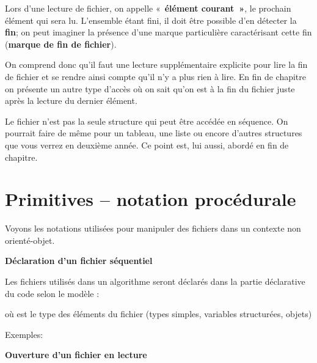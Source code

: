 Lors d'une lecture de fichier, on appelle
«~\textbf{élément courant~»}, le prochain élément qui sera lu.
L’ensemble étant fini, il doit être possible d’en détecter la
\textbf{fin}; on peut imaginer la présence d’une marque particulière
caractérisant cette fin (\textbf{marque de fin de fichier}).

On comprend donc qu'il faut une lecture supplémentaire
explicite pour lire la fin de fichier et se rendre ainsi compte
qu'il n'y a plus rien à lire. En fin
de chapitre on présente un autre type d'accès où on
sait qu'on est à la fin du fichier juste après la
lecture du dernier élément.

Le fichier n'est pas la seule structure qui peut être
accédée en séquence. On pourrait faire de même pour un tableau, une
liste ou encore d'autres structures que vous verrez en
deuxième année. Ce point est, lui aussi, abordé en fin de chapitre.


\section{Primitives – notation procédurale}

Voyons les notations utilisées pour manipuler des fichiers dans un
contexte non orienté-objet.

{\sffamily\bfseries\upshape
Déclaration d’un fichier séquentiel}

Les fichiers utilisés dans un algorithme seront déclarés dans la partie
déclarative du code selon le modèle : 


où  est le type des éléments du fichier (types
simples, variables structurées, objets)


Exemples:


\bigskip

{\sffamily\bfseries\upshape
Ouverture d’un fichier en lecture }


